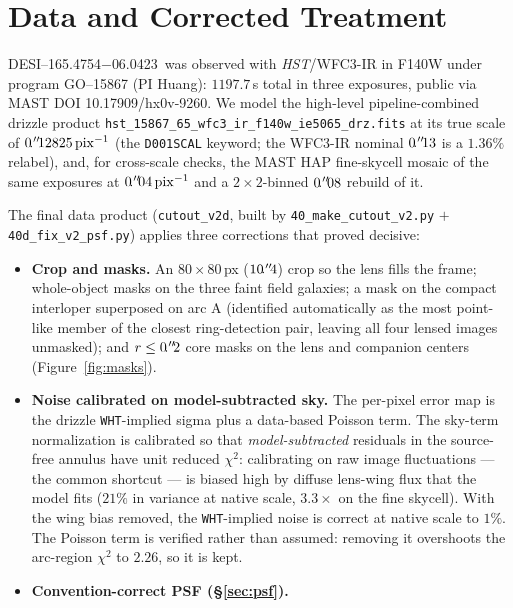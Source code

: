 \documentclass[11pt,letterpaper]{article}
\newcommand{\foundry}{DESI--165.4754$-$06.0423}
\begin{document}
\section{Data and Corrected Treatment}
\label{sec:data}

\foundry\ was observed with {\it HST}/WFC3-IR in F140W under program
GO--15867 (PI Huang): $1197.7$\,s total in three exposures, public via
MAST DOI 10.17909/hx0v-9260. We model the high-level pipeline-combined
drizzle product
\texttt{hst\_15867\_65\_wfc3\_ir\_f140w\_ie5065\_drz.fits} at its true
scale of $0\mbox{$\!\!\,.{}^{\prime\prime}\!\!\,$}12825\,\mathrm{pix}^{-1}$ (the \texttt{D001SCAL}
keyword; the WFC3-IR nominal $0\mbox{$\!\!\,.{}^{\prime\prime}\!\!\,$}13$ is a $1.36\%$ relabel), and,
for cross-scale checks, the MAST HAP fine-skycell mosaic of the same
exposures at $0\mbox{$\!\!\,.{}^{\prime\prime}\!\!\,$}04\,\mathrm{pix}^{-1}$ and a $2\times2$-binned
$0\mbox{$\!\!\,.{}^{\prime\prime}\!\!\,$}08$ rebuild of it.

The final data product (\texttt{cutout\_v2d}, built by
\texttt{40\_make\_cutout\_v2.py} $+$ \texttt{40d\_fix\_v2\_psf.py})
applies three corrections that proved decisive:

\begin{itemize}
\item {\bf Crop and masks.} An $80\times80$\,px ($10\mbox{$\!\!\,.{}^{\prime\prime}\!\!\,$}4$) crop so
the lens fills the frame; whole-object masks on the three faint field
galaxies; a mask on the compact interloper superposed on arc A
(identified automatically as the most point-like member of the closest
ring-detection pair, leaving all four lensed images unmasked); and
$r\le0\mbox{$\!\!\,.{}^{\prime\prime}\!\!\,$}2$ core masks on the lens and companion centers
(Figure~\ref{fig:masks}).
\item {\bf Noise calibrated on model-subtracted sky.} The per-pixel
error map is the drizzle \texttt{WHT}-implied sigma plus a data-based
Poisson term. The sky-term normalization is calibrated so that {\it
model-subtracted} residuals in the source-free annulus have unit
reduced $\chi^{2}$: calibrating on raw image fluctuations --- the
common shortcut --- is biased high by diffuse lens-wing flux that the
model fits ($21\%$ in variance at native scale, $3.3\times$ on the fine
skycell). With the wing bias removed, the \texttt{WHT}-implied noise is
correct at native scale to $1\%$. The Poisson term is verified rather
than assumed: removing it overshoots the arc-region $\chi^{2}$ to
$2.26$, so it is kept.
\item {\bf Convention-correct PSF (\S\ref{sec:psf}).}
\end{itemize}
\end{document}
